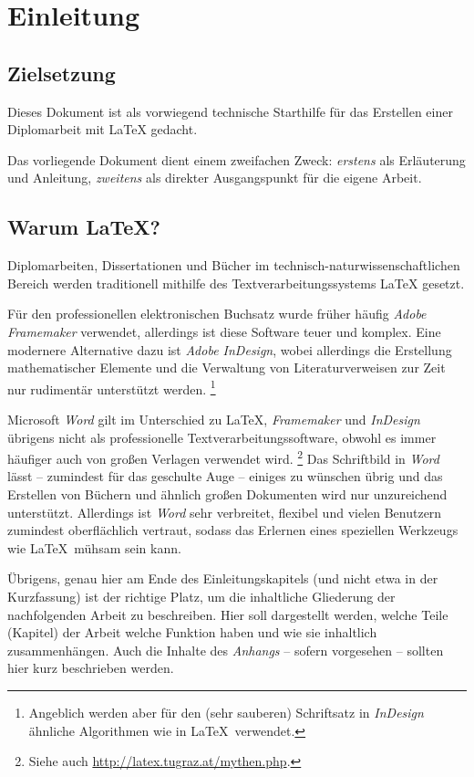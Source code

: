 \chapter{Einleitung}
\label{cha:sa_Einleitung}

\section{Zielsetzung}
Dieses Dokument ist als vorwiegend technische Starthilfe für das
Erstellen einer Diplomarbeit mit \LaTeX
gedacht.

Das vorliegende Dokument dient einem zweifachen Zweck: 
\emph{erstens} als Erläuterung und Anleitung, \emph{zweitens} als
direkter Ausgangspunkt für die eigene Arbeit.


\section{Warum {\LaTeX}?}

Diplomarbeiten, Dissertationen und Bücher im
technisch-natur\-wissen\-schaft\-lichen Bereich werden
traditionell mithilfe des Textverarbeitungssystems \LaTeX
\cite{Lamport94,Lamport95} gesetzt.

Für den professionellen elektronischen Buchsatz wurde früher
häufig \emph{Adobe Framemaker} verwendet, allerdings ist diese
Software teuer und komplex. Eine modernere Alternative dazu ist
\emph{Adobe InDesign}, wobei allerdings die Erstellung
mathematischer Elemente und die Verwaltung von Literaturverweisen
zur Zeit nur rudimentär unterstützt werden.%
\footnote{Angeblich werden aber für den (sehr sauberen) Schriftsatz 
	in \emph{InDesign} ähnliche Algorithmen wie in \LaTeX\ verwendet.}

Microsoft \emph{Word} gilt im Unterschied zu \LaTeX, 
\emph{Framemaker} und \emph{InDesign} übrigens nicht als professionelle
Textverarbeitungssoftware, obwohl es immer häufiger auch von
großen Verlagen verwendet wird.%
\footnote{Siehe auch \url{http://latex.tugraz.at/mythen.php}.}
Das Schriftbild in \emph{Word}
lässt -- zumindest für das geschulte Auge -- einiges zu wünschen
übrig und das Erstellen von Büchern und ähnlich großen Dokumenten
wird nur unzureichend unterstützt. Allerdings ist \emph{Word} sehr
verbreitet, flexibel und vielen Benutzern zumindest oberflächlich
vertraut, sodass das Erlernen eines speziellen Werkzeugs wie
\LaTeX\ mühsam sein kann.

Übrigens, genau hier am Ende des Einleitungskapitels (und nicht
etwa in der Kurzfassung) ist der richtige Platz, um die
inhaltliche Gliederung der nachfolgenden Arbeit zu beschreiben.
Hier soll dargestellt werden, welche Teile (Kapitel) der Arbeit
welche Funktion haben und wie sie inhaltlich zusammenhängen. Auch
die Inhalte des \emph{Anhangs} -- sofern vorgesehen -- sollten hier
kurz beschrieben werden.

